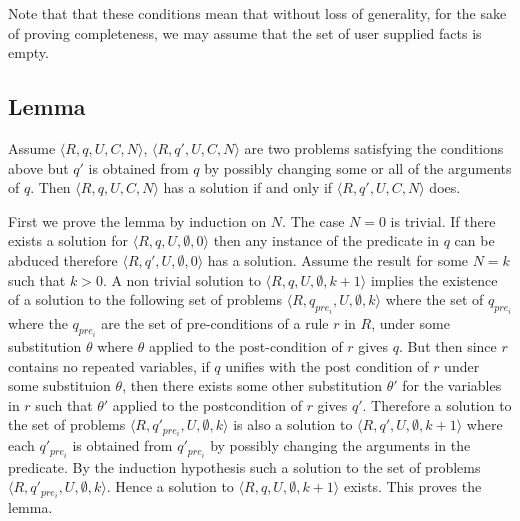 Note that that these conditions mean that without loss of generality, for the
sake of proving completeness, we may assume that the set of user supplied
facts is empty.

\subsection{Lemma}
Assume $\langle R,q,U,C,N\rangle$, $\langle R,q',U,C,N\rangle$ are two problems satisfying the conditions above but $q'$ is obtained from $q$ by possibly changing some or all of the arguments of $q$. Then $\langle R,q,U,C,N\rangle$ has a solution if and only if $\langle R,q',U,C,N\rangle$ does.

First we prove the lemma by induction on $N$.
The case $N = 0$ is trivial. If there exists a solution for $\langle R,q,U,\emptyset,0\rangle$ then any instance of the predicate in $q$ can be abduced therefore $\langle R,q',U,\emptyset,0\rangle$ has a solution. Assume the result for some $N = k$ such that $k>0$. A non trivial solution to $\langle R,q,U,\emptyset,k+1\rangle$ implies the existence of a solution to the following set of problems $\langle R,q_{pre_{i}},U,\emptyset,k\rangle$ where the set of $q_{pre_{i}}$ where the $q_{pre_{i}}$ are the set of pre-conditions of a rule $r$ in $R$, under some substitution $\theta$ where $\theta$ applied to the post-condition of $r$ gives $q$. But then since $r$ contains no repeated variables, if $q$ unifies with the post condition of $r$ under some substituion $\theta$, then there exists some other substitution $\theta'$ for the variables in $r$ such that $\theta'$ applied to the postcondition of $r$ gives $q'$. Therefore a solution to the set of problems $\langle R,q'_{pre_{i}},U,\emptyset,k\rangle$ is also a solution to $\langle R,q',U,\emptyset,k+1\rangle$ where each $q'_{pre_{i}}$ is obtained from $q'_{pre_{i}}$ by possibly changing the arguments in the predicate. By the induction hypothesis such a solution to the set of problems $\langle R,q'_{pre_{i}},U,\emptyset,k\rangle$. Hence a solution to  $\langle R,q,U,\emptyset,k+1\rangle$ exists. This proves the lemma.

